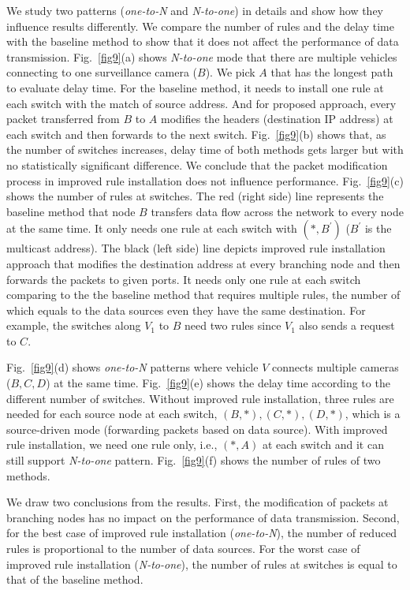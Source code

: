 \documentclass[journal]{IEEEtran}
\begin{document}
We study two patterns (\textit{one-to-N} and \textit{N-to-one}) in details and show how they influence results differently. We compare the number of rules and the delay time with the baseline method to show that it does not affect the performance of data transmission. Fig.~\ref{fig9}(a) shows \textit{N-to-one} mode that there are multiple vehicles connecting to one surveillance camera ($B$). We pick $A$ that has the longest path to evaluate delay time. For the baseline method, it needs to install one rule at each switch with the match of source address. And for proposed approach, every packet transferred from $B$ to $A$ modifies the headers (destination IP address) at each switch and then forwards to the next switch. Fig.~\ref{fig9}(b) shows that, as the number of switches increases, delay time of both methods gets larger but with no statistically significant difference. We conclude that the packet modification process in improved rule installation does not influence performance. Fig.~\ref{fig9}(c) shows the number of rules at switches. The red (right side) line represents the baseline method that node $B$ transfers data flow across the network to every node at the same time. It only needs one rule at each switch with $(*, B^{'})$ ($B^{'}$ is the multicast address). The black (left side) line depicts improved rule installation approach that modifies the destination address at every branching node and then forwards the packets to given ports. It needs only one rule at each switch comparing to the the baseline method that requires multiple rules, the number of which equals to the data sources even they have the same destination. For example, the switches along $V_1$ to $B$ need two rules since $V_1$ also sends a request to $C$.

Fig.~\ref{fig9}(d) shows \textit{one-to-N} patterns where vehicle $V$ connects multiple cameras ($B, C, D$) at the same time. Fig.~\ref{fig9}(e) shows the delay time according to the different number of switches. Without improved rule installation, three rules are needed for each source node at each switch, $(B, *), (C, *), (D, *)$, which is a source-driven mode (forwarding packets based on data source). With improved rule installation, we need one rule only, i.e., $(*, A)$ at each switch and it can still support \textit{N-to-one} pattern. Fig.~\ref{fig9}(f) shows the number of rules of two methods.

We draw two conclusions from the results. First, the modification of packets at branching nodes has no impact on the performance of data transmission. Second, for the best case of improved rule installation (\textit{one-to-N}), the number of reduced rules is proportional to the number of data sources. For the worst case of improved rule installation (\textit{N-to-one}), the number of rules at switches is equal to that of the baseline method.
\end{document}
